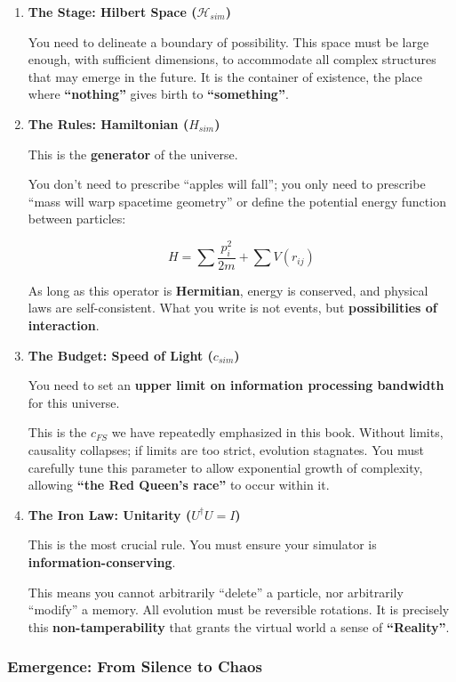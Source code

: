 \begin{enumerate}
\item \textbf{The Stage: Hilbert Space ($\mathcal{H}_{sim}$)}

You need to delineate a boundary of possibility. This space must be large enough, with sufficient dimensions, to accommodate all complex structures that may emerge in the future. It is the container of existence, the place where \textbf{``nothing''} gives birth to \textbf{``something''}.

\item \textbf{The Rules: Hamiltonian ($H_{sim}$)}

This is the \textbf{generator} of the universe.

You don't need to prescribe ``apples will fall''; you only need to prescribe ``mass will warp spacetime geometry'' or define the potential energy function between particles:

\[H = \sum \frac{p_i^2}{2m} + \sum V(r_{ij})\]

As long as this operator is \textbf{Hermitian}, energy is conserved, and physical laws are self-consistent. What you write is not events, but \textbf{possibilities of interaction}.

\item \textbf{The Budget: Speed of Light ($c_{sim}$)}

You need to set an \textbf{upper limit on information processing bandwidth} for this universe.

This is the \textbf{$c_{FS}$} we have repeatedly emphasized in this book. Without limits, causality collapses; if limits are too strict, evolution stagnates. You must carefully tune this parameter to allow exponential growth of complexity, allowing \textbf{``the Red Queen's race''} to occur within it.

\item \textbf{The Iron Law: Unitarity ($U^\dagger U = I$)}

This is the most crucial rule. You must ensure your simulator is \textbf{information-conserving}.

This means you cannot arbitrarily ``delete'' a particle, nor arbitrarily ``modify'' a memory. All evolution must be reversible rotations. It is precisely this \textbf{non-tamperability} that grants the virtual world a sense of \textbf{``Reality''}.
\end{enumerate}

\subsubsection{Emergence: From Silence to Chaos}

